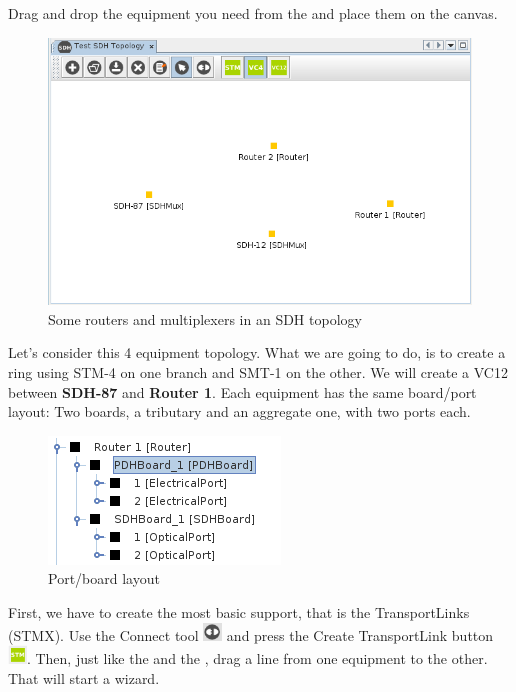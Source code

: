 \documentclass[a4paper]{article}
\begin{document}
		Drag and drop the equipment you need from the  and place them on the canvas.
		\begin{figure}[h!]
			\centering
			\includegraphics[width=\linewidth]{img/sdh_module_initial_view.png}
			\caption{Some routers and multiplexers in an SDH topology}
			\label{fig:sdh_module_initial_view}
		\end{figure}
		
		Let's consider this 4 equipment topology. What we are going to do, is to create a ring using STM-4 on one branch and SMT-1 on the other. We will create a VC12 between \textbf{SDH-87} and \textbf{Router 1}. Each equipment has the same board/port layout: Two boards, a tributary and an aggregate one, with two ports each.
		\begin{figure}[h!]
			\centering
			\includegraphics[width=0.4\linewidth]{img/sdh_module_layout.png}
			\caption{Port/board layout}
			\label{fig:sdh_module_layout}
		\end{figure}
		
		First, we have to create the most basic support, that is the TransportLinks (STMX). Use the Connect tool \includegraphics[width=0.5cm]{img/icon_connect_tool.png} and press the Create TransportLink button \includegraphics[width=0.5cm]{img/sdh_module_transport_link.png}. Then, just like the  and the , drag a line from one equipment to the other. That will start a wizard.\newline
		
\end{document}

